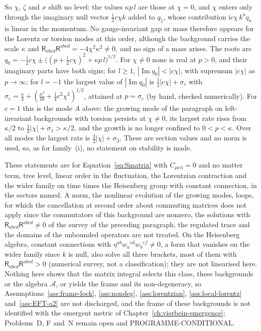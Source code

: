 So \(\chi\), \(\zeta\) and \(x\) shift no level: the values \(\kappa p\,l\) are those at \(\chi=0\), and \(\chi\) enters only through the imaginary null vector \(\tfrac{\mathrm i}2c\chi k\) added to \(q_\parallel\), whose contribution \(\mathrm ic\chi\,k^aq_a\) is linear in the momentum. No gauge-invariant gap or mass therefore appears for the Lorentz or torsion modes at this order, although the background carries the scale \(\kappa\) and \(\mathsf R_{abcd}\mathsf R^{abcd}=-4\chi^2\kappa^2\neq0\), and no sign of a mass arises. The roots are \(q_0=-\tfrac{\mathrm i}2c\chi\pm\bigl((p+\tfrac{\mathrm i}2c\chi)^2+\kappa p\,l\bigr)^{1/2}\). For \(\chi\neq0\) none is real at \(p>0\), and their imaginary parts have both signs; for \(l\ge1\), \(|\operatorname{Im}q_0|<|c\chi|\), with supremum \(|c\chi|\) as \(p\to\infty\); for \(l=-1\) the largest value of \(|\operatorname{Im}q_0|\) is \(\tfrac12|c\chi|+\sigma_c\) with \(\sigma_c=\tfrac\kappa4+(\tfrac{\kappa^2}{16}+\tfrac14c^2\chi^2)^{1/2}\), attained at \(p=\sigma_c\) (by hand, checked numerically). For \(c=1\) this is the mode \(A\) above: the growing mode of the paragraph on left-invariant backgrounds with torsion persists at \(\chi\neq0\), its largest rate rises from \(\kappa/2\) to \(\tfrac12|\chi|+\sigma_1>\kappa/2\), and the growth is no longer confined to \(0<p<\kappa\). Over all modes the largest rate is \(\tfrac32|\chi|+\sigma_3\). These are section values and no norm is used, so, as for family~(i), no statement on stability is made.

These statements are for Equation~\eqref{eq:Smatrix} with \(C_{\mu\nu\lambda}=0\) and no matter term, tree level, linear order in the fluctuation, the Lorentzian contraction and the wider family on time times the Heisenberg group with constant connection, in the sectors named. A norm, the nonlinear evolution of the growing modes, loops, for which the cancellation at second order about commuting matrices does not apply since the commutators of this background are nonzero, the solutions with \(\mathsf R_{abcd}\mathsf R^{abcd}\neq0\) of the survey of the preceding paragraph, the regulated trace and the domains of the unbounded operators are not treated. On the Heisenberg algebra, constant connections with \(\eta^{ab}w_a{}^{cd}w_b{}^{ef}\neq0\), a form that vanishes on the wider family since \(k\) is null, also solve all three brackets, most of them with \(\mathsf R_{abcd}\mathsf R^{abcd}>0\) (numerical survey, not a classification); they are not linearised here. Nothing here shows that the matrix integral selects this class, these backgrounds or the algebra \(\mathcal A\), or yields the frame and its non-degeneracy, so Assumptions~\ref{ass:frame-lock}, \ref{ass:nondeg}, \ref{ass:lorentzian}, \ref{ass:local-lorentz} and~\ref{ass:EFT-a2} are not discharged, and the frame of these backgrounds is not identified with the emergent metric of Chapter~\ref{ch:vierbein-emergence}; Problems~D, F and~N remain open and PROGRAMME-CONDITIONAL.
